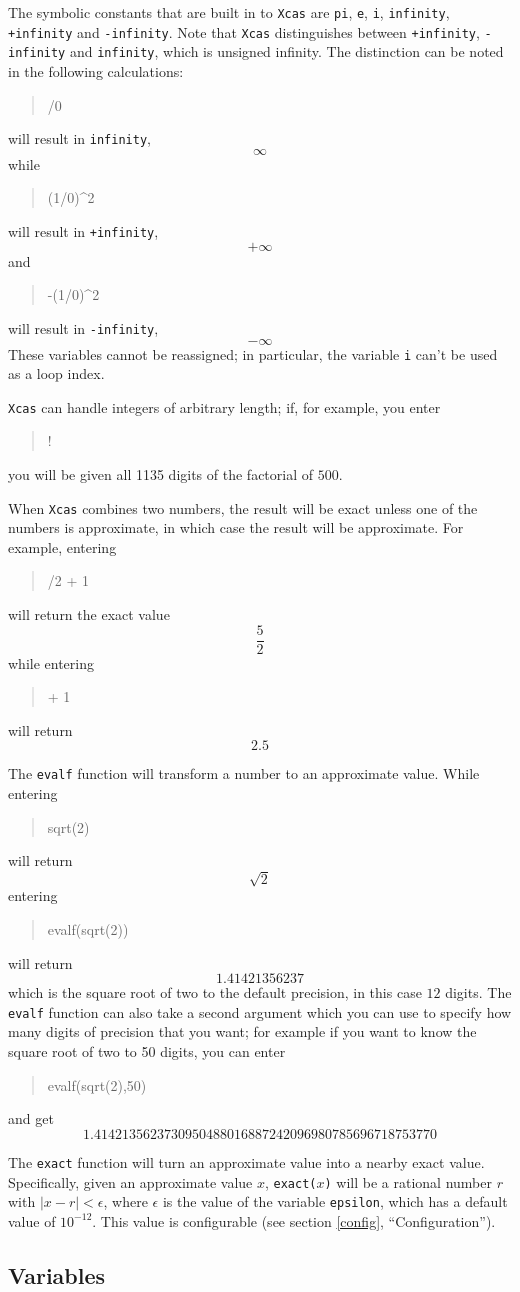 \documentclass{article}
\newcommand{\xcasin}[1]
{\begin{quote}\ttfamily
#1
\end{quote}}
\newcommand{\xcasout}[1]
{\begin{equation*}
#1
\end{equation*}}
\begin{document}
The symbolic constants that are built in to \texttt{Xcas} are
\texttt{pi}, \texttt{e}, \texttt{i}, \texttt{infinity},
\texttt{+infinity} and \texttt{-infinity}.
Note that \texttt{Xcas} distinguishes between \texttt{+infinity},
\texttt{-infinity} and \texttt{infinity}, which is unsigned infinity.
The distinction can be noted in the following calculations:
\xcasin{1/0}
will result in \texttt{infinity},
\xcasout{\infty}
while
\xcasin{(1/0)\^{}2}
will result in \texttt{+infinity},
\xcasout{+\infty}
and
\xcasin{-(1/0)\^{}2}
will result in \texttt{-infinity},
\xcasout{-\infty}
These variables cannot be reassigned; in particular, the variable
\texttt{i} can't be used as a loop index.

\texttt{Xcas} can handle integers of arbitrary length; if, for
example, you enter
\xcasin{500!}
you will be given all 1135 digits of the factorial of $500$.

When \texttt{Xcas} combines two numbers, the result will be exact
unless one of the numbers is approximate, in which case the result
will be approximate.  For example, entering
\xcasin{3/2 + 1}
will return the exact value
\xcasout{\frac{5}{2}}
while entering
\xcasin{1.5 + 1}
will return
\xcasout{2.5}

The \texttt{evalf} function will transform a number to an approximate
value.  While entering
\xcasin{sqrt(2)}
will return
\xcasout{\sqrt{2}}
entering
\xcasin{evalf(sqrt(2))}
will return
\xcasout{1.41421356237}
which is the square root of two to the default precision, in this case
$12$ digits.  The \texttt{evalf} function can also take a second
argument which you can use to specify how many digits of precision
that you want; for example if you want to know the square root of two
to 50 digits, you can enter
\xcasin{evalf(sqrt(2),50)}
and get
\xcasout{1.4142135623730950488016887242096980785696718753770}

The \texttt{exact} function will turn an approximate value into a nearby
exact value.  Specifically, given an approximate value $x$,
\texttt{exact($x$)} will be a rational number $r$ with
$|x - r| < \epsilon$, where $\epsilon$ is the value of the variable
\texttt{epsilon}, which has a default value of $10^{-12}$.  This value
is configurable (see section \ref{config}, ``Configuration'').


\subsection{Variables}
\end{document}
